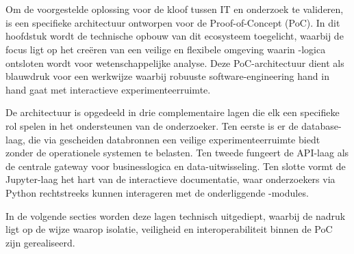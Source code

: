 \chapter{}%
\label{ch:architectuur}

Om de voorgestelde oplossing voor de kloof tussen IT en onderzoek te valideren, is een specifieke architectuur ontworpen voor de Proof-of-Concept (PoC). In dit hoofdstuk wordt de technische opbouw van dit ecosysteem toegelicht, waarbij de focus ligt op het creëren van een veilige en flexibele omgeving waarin -logica ontsloten wordt voor wetenschappelijke analyse. Deze PoC-architectuur dient als blauwdruk voor een werkwijze waarbij robuuste software-engineering hand in hand gaat met interactieve experimenteerruimte.

De architectuur is opgedeeld in drie complementaire lagen die elk een specifieke rol spelen in het ondersteunen van de onderzoeker. Ten eerste is er de database-laag, die via gescheiden databronnen een veilige experimenteerruimte biedt zonder de operationele systemen te belasten. Ten tweede fungeert de API-laag als de centrale gateway voor businesslogica en data-uitwisseling. Ten slotte vormt de Jupyter-laag het hart van de interactieve documentatie, waar onderzoekers via Python rechtstreeks kunnen interageren met de onderliggende -modules.

In de volgende secties worden deze lagen technisch uitgediept, waarbij de nadruk ligt op de wijze waarop isolatie, veiligheid en interoperabiliteit binnen de PoC zijn gerealiseerd.
